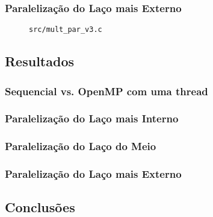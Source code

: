 \documentclass[a4paper, 12pt]{article}
\begin{document}
\subsubsection{Paralelização do Laço mais Externo}

\begin{figure}[H]
    \centering
    
    \caption{\texttt{src/mult\_par\_v3.c}}
    \label{fig:par_v3}
\end{figure}

\subsection{Resultados} \label{sec:res}

\subsubsection{Sequencial vs. OpenMP com uma thread}

\subsubsection{Paralelização do Laço mais Interno}

\subsubsection{Paralelização do Laço do Meio}

\subsubsection{Paralelização do Laço mais Externo}

\subsection{Conclusões} \label{sec:dis}

%
%
\end{document}
